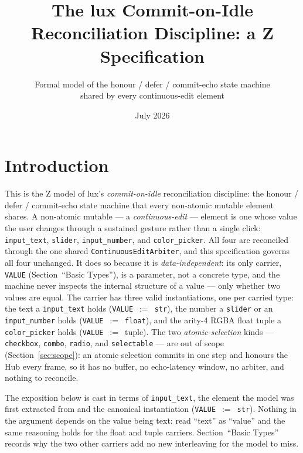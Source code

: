 \documentclass[a4paper,10pt,fleqn]{article}
\begin{document}
\title{The lux Commit-on-Idle Reconciliation Discipline: a Z Specification}
\author{Formal model of the honour / defer / commit-echo state machine\\
  shared by every continuous-edit element}
\date{July 2026}
\maketitle

\section{Introduction}

This is the Z model of lux's \emph{commit-on-idle} reconciliation discipline:
the honour / defer / commit-echo state machine that every non-atomic mutable
element shares.  A non-atomic mutable --- a \emph{continuous-edit} --- element is
one whose value the user changes through a sustained gesture rather than a
single click: \texttt{input\_text}, \texttt{slider}, \texttt{input\_number}, and
\texttt{color\_picker}.  All four are reconciled through the one shared
\texttt{ContinuousEditArbiter}, and this specification governs all four
unchanged.  It does so because it is \emph{data-independent}: its only carrier,
\texttt{VALUE} (Section~``Basic Types''), is a parameter, not a concrete type,
and the machine never inspects the internal structure of a value --- only
whether two values are equal.  The carrier has three valid instantiations, one
per carried type: the text a \texttt{input\_text} holds
(\texttt{VALUE}~$:=$~\texttt{str}), the number a \texttt{slider} or an
\texttt{input\_number} holds (\texttt{VALUE}~$:=$~\texttt{float}), and the
arity-4 RGBA float tuple a \texttt{color\_picker} holds
(\texttt{VALUE}~$:=$~tuple).  The two \emph{atomic-selection} kinds ---
\texttt{checkbox}, \texttt{combo}, \texttt{radio}, and \texttt{selectable} ---
are out of scope (Section~\ref{sec:scope}): an atomic selection commits in one
step and honours the Hub every frame, so it has no buffer, no echo-latency
window, no arbiter, and nothing to reconcile.

The exposition below is cast in terms of \texttt{input\_text}, the element the
model was first extracted from and the canonical instantiation
(\texttt{VALUE}~$:=$~\texttt{str}).  Nothing in the argument depends on the value
being text: read ``text'' as ``value'' and the same reasoning holds for the
float and tuple carriers.  Section~``Basic Types'' records why the two other
carriers add no new interleaving for the model to miss.
\end{document}

